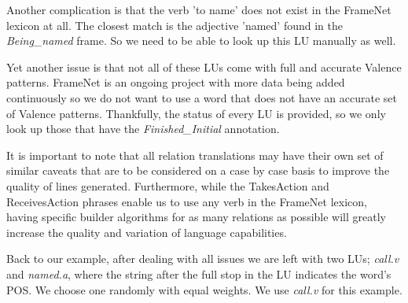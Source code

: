 Another complication is that the verb 'to name' does not exist in the FrameNet lexicon at all. The closest match is the adjective 'named' found in the \textit{Being\_named} frame. So we need to be able to look up this LU manually as well.

Yet another issue is that not all of these LUs come with full and accurate Valence patterns. FrameNet is an ongoing project with more data being added continuously so we do not want to use a word that does not have an accurate set of Valence patterns. Thankfully, the status of every LU is provided, so we only look up those that have the \textit{Finished\_Initial} annotation.

It is important to note that all relation translations may have their own set of similar caveats that are to be considered on a case by case basis to improve the quality of lines generated. Furthermore, while the TakesAction and ReceivesAction phrases enable us to use any verb in the FrameNet lexicon, having specific builder algorithms for as many relations as possible will greatly increase the quality and variation of language capabilities.

Back to our example, after dealing with all issues we are left with two LUs; \textit{call.v} and \textit{named.a}, where the string after the full stop in the LU indicates the word's POS. We choose one randomly with equal weights. We use \textit{call.v} for this example.

